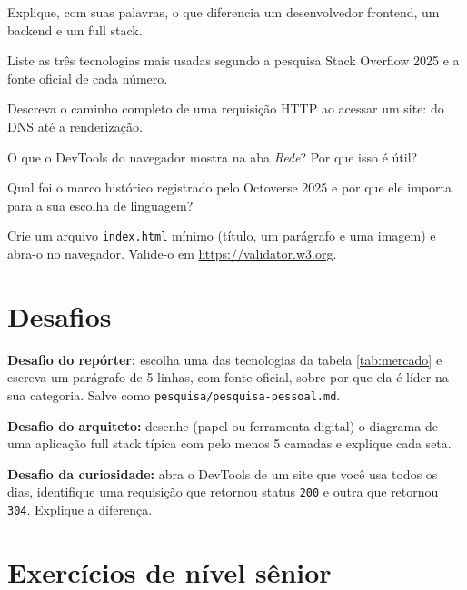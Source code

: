 \begin{exercicios}
  \item Explique, com suas palavras, o que diferencia um desenvolvedor
  frontend, um backend e um full stack.
  \item Liste as três tecnologias mais usadas segundo a pesquisa Stack
  Overflow 2025 e a fonte oficial de cada número.
  \item Descreva o caminho completo de uma requisição HTTP ao acessar um site:
  do DNS até a renderização.
  \item O que o DevTools do navegador mostra na aba \emph{Rede}? Por que isso
  é útil?
  \item Qual foi o marco histórico registrado pelo Octoverse 2025 e por que
  ele importa para a sua escolha de linguagem?
  \item Crie um arquivo \texttt{index.html} mínimo (título, um parágrafo e uma
  imagem) e abra-o no navegador. Valide-o em \url{https://validator.w3.org}.
\end{exercicios}

\section{Desafios}

\begin{desafios}
  \item \textbf{Desafio do repórter:} escolha uma das tecnologias da tabela
  \ref{tab:mercado} e escreva um parágrafo de 5 linhas, com fonte oficial, sobre
  por que ela é líder na sua categoria. Salve como \texttt{pesquisa/pesquisa-pessoal.md}.
  \item \textbf{Desafio do arquiteto:} desenhe (papel ou ferramenta digital) o
  diagrama de uma aplicação full stack típica com pelo menos 5 camadas e
  explique cada seta.
  \item \textbf{Desafio da curiosidade:} abra o DevTools de um site que você
  usa todos os dias, identifique uma requisição que retornou status \texttt{200}
  e outra que retornou \texttt{304}. Explique a diferença.
\end{desafios}

\section{Exercícios de nível sênior}

